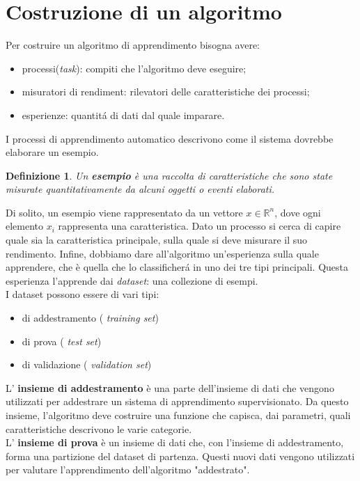 \documentclass[a4paper,12pt,oneside]{book}
\begin{document}
\section{Costruzione di un algoritmo}\label{Costruzione}
Per costruire un algoritmo di apprendimento bisogna avere:
\begin{itemize}
\item processi(\textit{task}): compiti che l'algoritmo deve eseguire;
\item misuratori di rendiment: rilevatori delle caratteristiche dei processi;
\item esperienze: quantit\'{a} di dati dal quale imparare.
\end{itemize}
I processi di apprendimento automatico descrivono come il sistema dovrebbe elaborare un esempio.
\newtheorem{defin}{Definizione}
\begin{defin}
Un \textbf{esempio} \`e una raccolta di caratteristiche che sono state misurate quantitativamente da alcuni oggetti o eventi elaborati.
\end{defin}
Di solito, un esempio viene rappresentato da un vettore $x\in \mathbb{R}^{n}$, dove ogni elemento $x_{i}$ rappresenta una caratteristica.
Dato un processo si cerca di capire quale sia la caratteristica principale, sulla quale si deve misurare il suo rendimento.
Infine, dobbiamo dare all'algoritmo un'esperienza sulla quale apprendere, che \`e quella che lo classificher\'{a} in uno dei tre tipi principali.
Questa esperienza l'apprende dai \textit{dataset}: una collezione di esempi.\\
I dataset possono essere di vari tipi:
\begin{itemize}
\item di addestramento ( \textit{training set})
\item di prova ( \textit{test set})
\item di validazione ( \textit{validation set})
\end{itemize}
L' \textbf{insieme di addestramento} \`e una parte dell'insieme di dati che vengono utilizzati per addestrare un sistema di apprendimento supervisionato. Da questo insieme, l'algoritmo deve costruire una funzione che capisca, dai parametri, quali caratteristiche descrivono le varie categorie.\\
L' \textbf{insieme di prova} \`e un insieme di dati che, con l'insieme di addestramento, forma una partizione del dataset di partenza. Questi nuovi dati vengono utilizzati per valutare l'apprendimento dell'algoritmo "addestrato".\\
\end{document}
